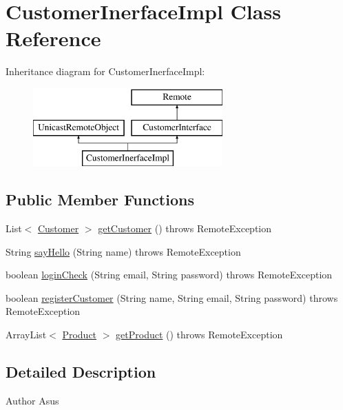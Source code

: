 \hypertarget{class_customer_inerface_impl}{}\section{Customer\+Inerface\+Impl Class Reference}
\label{class_customer_inerface_impl}
Inheritance diagram for Customer\+Inerface\+Impl\+:\begin{figure}[H]
\begin{center}
\leavevmode
\includegraphics[height=3.000000cm]{class_customer_inerface_impl}
\end{center}
\end{figure}
\subsection*{Public Member Functions}
\begin{DoxyCompactItemize}
\item 
List$<$ \mbox{\hyperlink{class_customer}{Customer}} $>$ \mbox{\hyperlink{class_customer_inerface_impl_a488e7019e10ff327c1ddda2df06aafc2}{get\+Customer}} ()  throws Remote\+Exception 
\item 
String \mbox{\hyperlink{class_customer_inerface_impl_abf7eca8202321d451365ad57abe6d6de}{say\+Hello}} (String name)  throws Remote\+Exception 
\item 
boolean \mbox{\hyperlink{class_customer_inerface_impl_a508e5e0b67fd7dc5b0852af19d20bc31}{login\+Check}} (String email, String password)  throws Remote\+Exception 
\item 
boolean \mbox{\hyperlink{class_customer_inerface_impl_aa5029a5038b56d80f3858d8e259f2f20}{register\+Customer}} (String name, String email, String password)  throws Remote\+Exception 
\item 
Array\+List$<$ \mbox{\hyperlink{class_product}{Product}} $>$ \mbox{\hyperlink{class_customer_inerface_impl_aae8b5ef23db5d8e651663cd8e29ac013}{get\+Product}} ()  throws Remote\+Exception 
\end{DoxyCompactItemize}


\subsection{Detailed Description}
\begin{DoxyAuthor}{Author}
Asus 
\end{DoxyAuthor}


